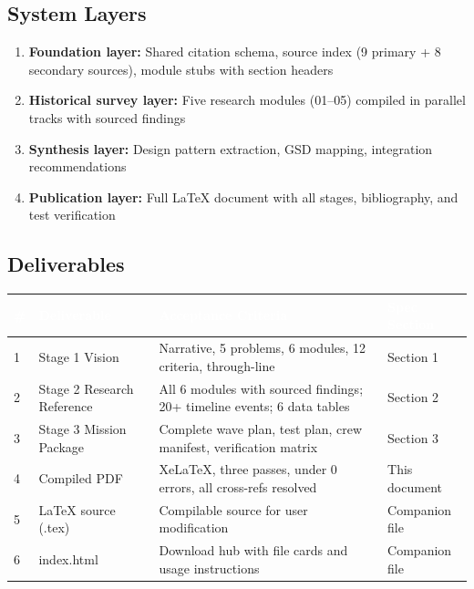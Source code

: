 \documentclass[11pt,letterpaper]{article}
\newcommand{\tableheader}[1]{\textbf{\sffamily\textcolor{white}{#1}}}
\begin{document}
\subsection{System Layers}

\begin{enumerate}
  \item \textbf{Foundation layer:} Shared citation schema, source index (9 primary + 8 secondary sources), module stubs with section headers
  \item \textbf{Historical survey layer:} Five research modules (01--05) compiled in parallel tracks with sourced findings
  \item \textbf{Synthesis layer:} Design pattern extraction, GSD mapping, integration recommendations
  \item \textbf{Publication layer:} Full LaTeX document with all stages, bibliography, and test verification
\end{enumerate}

\subsection{Deliverables}

\begin{center}
\begin{tabularx}{\textwidth}{C{0.5cm}L{3.5cm}L{5cm}L{3cm}}
\toprule
{}
\tableheader{\#} & \tableheader{Deliverable} & \tableheader{Acceptance Criteria} & \tableheader{Spec Section} \\
 & Stage 1 Vision & Narrative, 5 problems, 6 modules, 12 criteria, through-line & Section 1 \\
2 & Stage 2 Research Reference & All 6 modules with sourced findings; 20+ timeline events; 6 data tables & Section 2 \\
3 & Stage 3 Mission Package & Complete wave plan, test plan, crew manifest, verification matrix & Section 3 \\
4 & Compiled PDF & XeLaTeX, three passes, under 0 errors, all cross-refs resolved & This document \\
5 & LaTeX source (.tex) & Compilable source for user modification & Companion file \\
6 & index.html & Download hub with file cards and usage instructions & Companion file \\
\bottomrule
\end{tabularx}
\end{center}
\end{document}
